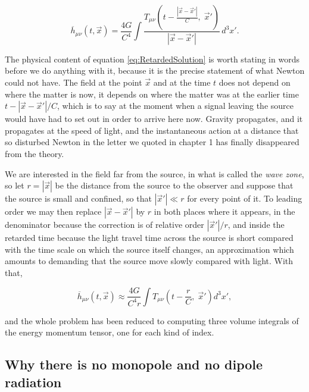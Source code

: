         \begin{equation}\label{eq:RetardedSolution}
            \overline{h}_{\mu\nu}(t,\Vec{x}) = \frac{4G}{C^4}\int\frac{T_{\mu\nu}\left(t - \frac{|\Vec{x}-\Vec{x}'|}{C},\;\Vec{x}'\right)}{|\Vec{x}-\Vec{x}'|}\,d^3x'.
        \end{equation}

        The physical content of equation \ref{eq:RetardedSolution} is worth stating in words before we do anything with it, because it is the precise statement of what Newton could not have. The field at the point $\Vec{x}$ and at the time $t$ does not depend on where the matter is now, it depends on where the matter was at the earlier time $t - |\Vec{x}-\Vec{x}'|/C$, which is to say at the moment when a signal leaving the source would have had to set out in order to arrive here now. Gravity propagates, and it propagates at the speed of light, and the instantaneous action at a distance that so disturbed Newton in the letter we quoted in chapter 1 has finally disappeared from the theory.

        We are interested in the field far from the source, in what is called the \textit{wave zone}, so let $r=|\Vec{x}|$ be the distance from the source to the observer and suppose that the source is small and confined, so that $|\Vec{x}'|\ll r$ for every point of it. To leading order we may then replace $|\Vec{x}-\Vec{x}'|$ by $r$ in both places where it appears, in the denominator because the correction is of relative order $|\Vec{x}'|/r$, and inside the retarded time because the light travel time across the source is short compared with the time scale on which the source itself changes, an approximation which amounts to demanding that the source move slowly compared with light. With that,

        \begin{equation}\label{eq:FarField}
            \overline{h}_{\mu\nu}(t,\Vec{x}) \approx \frac{4G}{C^4r}\int T_{\mu\nu}\left(t-\frac{r}{C},\;\Vec{x}'\right)d^3x',
        \end{equation}

        and the whole problem has been reduced to computing three volume integrals of the energy momentum tensor, one for each kind of index.

    \subsection{Why there is no monopole and no dipole radiation}

